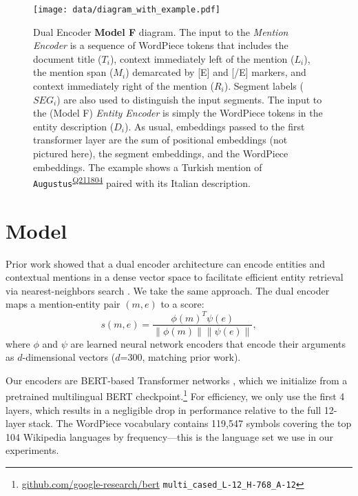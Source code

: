 \documentclass[11pt,a4paper]{article}
\newcommand{\entity}[1]{\texttt{#1}}
\newcommand{\ientity}[2]{\entity{#1}\textsuperscript{\href{https://www.wikidata.org/wiki/#2}{#2}}}
\begin{document}
\begin{figure*}
  \centering
  \texttt{[image: data/diagram\_with\_example.pdf]}
  \caption{
  \small Dual Encoder \textbf{Model F} diagram. The input to the \textit{Mention Encoder} is a sequence of WordPiece tokens that includes the document title ($T_i$), context immediately left of the mention ($L_i$), the mention span ($M_i$) demarcated by [E] and [/E] markers, and context immediately right of the mention ($R_i$). Segment labels ($SEG_i$) are also used to distinguish the input segments. The input to the (Model F) \textit{Entity Encoder} is simply the WordPiece tokens in the entity description ($D_i$). As usual, embeddings passed to the first transformer layer are the sum of positional embeddings (not pictured here), the segment embeddings, and the WordPiece embeddings. The example shows a Turkish mention of \ientity{Augustus}{Q211804} paired with its Italian description. \label{fig:architecture}} 
\end{figure*}

\section{Model}
Prior work showed that a dual encoder architecture can encode entities and contextual mentions in a dense vector space to facilitate efficient entity retrieval via nearest-neighbors search \citep{gillick-etal-2019-learning,wu2019zeroshot}.
We take the same approach.
The dual encoder maps a mention-entity pair $(m,e)$ to a score:
\begin{equation}\label{eq:cosine}
    s(m,e) = \frac{\phi(m)^T \psi(e)}{\|\phi(m)\| \|\psi(e)\|},
\end{equation}
where $\phi$ and $\psi$ are learned neural network encoders that encode their arguments as $d$-dimensional vectors ($d$=300, matching prior work).

Our encoders are BERT-based Transformer networks \cite{vaswani2017attention,devlin-etal-2019-bert}, which we initialize from a pretrained multilingual BERT checkpoint.\footnote{\url{github.com/google-research/bert} \texttt{multi\_cased\_L-12\_H-768\_A-12}}
For efficiency, we only use the first 4 layers, which results in a negligible drop in performance relative to the full 12-layer stack. 
The WordPiece vocabulary contains 119,547 symbols covering the top 104 Wikipedia languages by frequency---this is the language set we use in our experiments.
\end{document}
